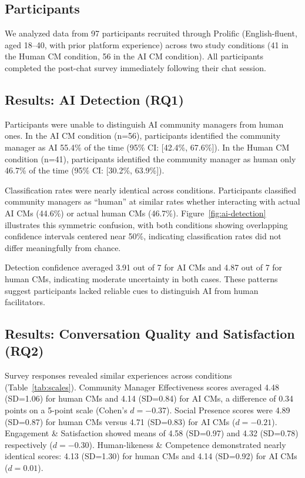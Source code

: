 \documentclass[twocolumn,10pt]{article}
\begin{document}
\subsection{Participants}

We analyzed data from 97 participants recruited through Prolific (English-fluent, aged 18–40, with prior platform experience) across two study conditions (41 in the Human CM condition, 56 in the AI CM condition). All participants completed the post-chat survey immediately following their chat session.

\subsection{Results: AI Detection (RQ1)}

Participants were unable to distinguish AI community managers from human ones. In the AI CM condition (n=56), participants identified the community manager as AI 55.4\% of the time (95\% CI: [42.4\%, 67.6\%]). In the Human CM condition (n=41), participants identified the community manager as human only 46.7\% of the time (95\% CI: [30.2\%, 63.9\%]).

Classification rates were nearly identical across conditions. Participants classified community managers as ``human'' at similar rates whether interacting with actual AI CMs (44.6\%) or actual human CMs (46.7\%). Figure~\ref{fig:ai-detection} illustrates this symmetric confusion, with both conditions showing overlapping confidence intervals centered near 50\%, indicating classification rates did not differ meaningfully from chance.

Detection confidence averaged 3.91 out of 7 for AI CMs and 4.87 out of 7 for human CMs, indicating moderate uncertainty in both cases. These patterns suggest participants lacked reliable cues to distinguish AI from human facilitators.

\subsection{Results: Conversation Quality and Satisfaction (RQ2)}

Survey responses revealed similar experiences across conditions (Table~\ref{tab:scales}). Community Manager Effectiveness scores averaged 4.48 (SD=1.06) for human CMs and 4.14 (SD=0.84) for AI CMs, a difference of 0.34 points on a 5-point scale (Cohen's $d = -0.37$). Social Presence scores were 4.89 (SD=0.87) for human CMs versus 4.71 (SD=0.83) for AI CMs ($d = -0.21$). Engagement \& Satisfaction showed means of 4.58 (SD=0.97) and 4.32 (SD=0.78) respectively ($d = -0.30$). Human-likeness \& Competence demonstrated nearly identical scores: 4.13 (SD=1.30) for human CMs and 4.14 (SD=0.92) for AI CMs ($d = 0.01$).
\end{document}
